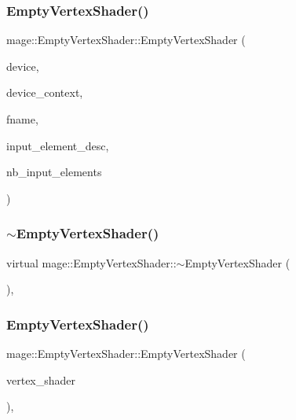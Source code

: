 \subsubsection{\texorpdfstring{Empty\+Vertex\+Shader()}{EmptyVertexShader()}\hspace{0.1cm}{\footnotesize\ttfamily [1/3]}}
{\footnotesize\ttfamily mage\+::\+Empty\+Vertex\+Shader\+::\+Empty\+Vertex\+Shader (\begin{DoxyParamCaption}\item[{I\+D3\+D11\+Device2 $\ast$}]{device,  }\item[{I\+D3\+D11\+Device\+Context2 $\ast$}]{device\+\_\+context,  }\item[{const wstring \&}]{fname,  }\item[{const D3\+D11\+\_\+\+I\+N\+P\+U\+T\+\_\+\+E\+L\+E\+M\+E\+N\+T\+\_\+\+D\+E\+SC $\ast$}]{input\+\_\+element\+\_\+desc,  }\item[{uint32\+\_\+t}]{nb\+\_\+input\+\_\+elements }\end{DoxyParamCaption})}

\hypertarget{classmage_1_1_empty_vertex_shader_a321ef00a2087030b81713e989ab02306}{}\label{classmage_1_1_empty_vertex_shader_a321ef00a2087030b81713e989ab02306} 
\subsubsection{\texorpdfstring{$\sim$\+Empty\+Vertex\+Shader()}{~EmptyVertexShader()}}
{\footnotesize\ttfamily virtual mage\+::\+Empty\+Vertex\+Shader\+::$\sim$\+Empty\+Vertex\+Shader (\begin{DoxyParamCaption}{ }\end{DoxyParamCaption})\hspace{0.3cm}{\ttfamily [virtual]}, {\ttfamily [default]}}

\hypertarget{classmage_1_1_empty_vertex_shader_a6ab1b22d108fde8f8876e6a2e4c0decb}{}\label{classmage_1_1_empty_vertex_shader_a6ab1b22d108fde8f8876e6a2e4c0decb} 
\subsubsection{\texorpdfstring{Empty\+Vertex\+Shader()}{EmptyVertexShader()}\hspace{0.1cm}{\footnotesize\ttfamily [2/3]}}
{\footnotesize\ttfamily mage\+::\+Empty\+Vertex\+Shader\+::\+Empty\+Vertex\+Shader (\begin{DoxyParamCaption}\item[{const \hyperlink{classmage_1_1_empty_vertex_shader}{Empty\+Vertex\+Shader} \&}]{vertex\+\_\+shader }\end{DoxyParamCaption})\hspace{0.3cm}{\ttfamily [private]}, {\ttfamily [delete]}}

